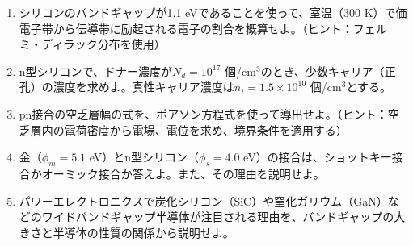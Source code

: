 \begin{enumerate}
\item シリコンのバンドギャップが1.1 eVであることを使って、室温（300 K）で価電子帯から伝導帯に励起される電子の割合を概算せよ。（ヒント：フェルミ・ディラック分布を使用）

\item n型シリコンで、ドナー濃度が$N_d = 10^{17}$ 個/cm$^3$のとき、少数キャリア（正孔）の濃度を求めよ。真性キャリア濃度は$n_i = 1.5 \times 10^{10}$ 個/cm$^3$とする。

\item pn接合の空乏層幅の式を、ポアソン方程式を使って導出せよ。（ヒント：空乏層内の電荷密度から電場、電位を求め、境界条件を適用する）

\item 金（$\phi_m = 5.1$ eV）とn型シリコン（$\phi_s = 4.0$ eV）の接合は、ショットキー接合かオーミック接合か答えよ。また、その理由を説明せよ。

\item パワーエレクトロニクスで炭化シリコン（SiC）や窒化ガリウム（GaN）などのワイドバンドギャップ半導体が注目される理由を、バンドギャップの大きさと半導体の性質の関係から説明せよ。
\end{enumerate}
